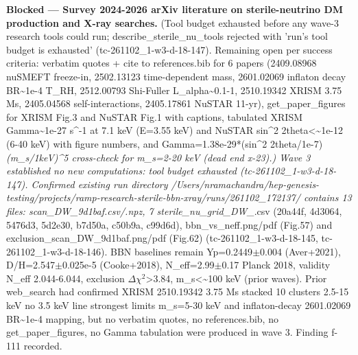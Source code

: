 \documentclass[11pt,a4paper]{article}
\begin{document}
\textbf{Blocked --- Survey 2024-2026 arXiv literature on sterile-neutrino DM production and X-ray searches.} (Tool budget exhausted before any wave-3 research tools could run; describe\_sterile\_nu\_tools rejected with 'run's tool budget is exhausted' (tc-261102\_1-w3-d-18-147). Remaining open per success criteria: verbatim quotes + cite to references.bib for 6 papers (2409.08968 nuSMEFT freeze-in, 2502.13123 time-dependent mass, 2601.02069 inflaton decay BR\textasciitilde{}1e-4 T\_RH, 2512.00793 Shi-Fuller L\_alpha\textasciitilde{}0.1-1, 2510.19342 XRISM 3.75 Ms, 2405.04568 self-interactions, 2405.17861 NuSTAR 11-yr), get\_paper\_figures for XRISM Fig.3 and NuSTAR Fig.1 with captions, tabulated XRISM Gamma\textasciitilde{}1e-27 s\textasciicircum{}-1 at 7.1 keV (E=3.55 keV) and NuSTAR sin\textasciicircum{}2 2theta\textless{}\textasciitilde{}1e-12 (6-40 keV) with figure numbers, and Gamma=1.38e-29*(sin\textasciicircum{}2 2theta/1e-7)\textit{(m\_s/1keV)\textasciicircum{}5 cross-check for m\_s=2-20 keV (dead end x-23).) Wave 3 established no new computations: tool budget exhausted (tc-261102\_1-w3-d-18-147). Confirmed existing run directory /Users/nramachandra/hep-genesis-testing/projects/ramp-research-sterile-bbn-xray/runs/261102\_172137/ contains 13 files: scan\_DW\_9d1baf.csv/.npz, 7 sterile\_nu\_grid\_DW\_}.csv (20a44f, 4d3064, 5476d3, 5d2e30, b7d50a, c50b9a, c99d6d), bbn\_vs\_neff.png/pdf (Fig.57) and exclusion\_scan\_DW\_9d1baf.png/pdf (Fig.62) (tc-261102\_1-w3-d-18-145, tc-261102\_1-w3-d-18-146). BBN baselines remain Yp=0.2449$\pm$0.004 (Aver+2021), D/H=2.547$\pm$0.025e-5 (Cooke+2018), N\_eff=2.99$\pm$0.17 Planck 2018, validity N\_eff 2.044-6.044, exclusion $\Delta$$\chi$$^2$\textgreater{}3.84, m\_s\textless{}\textasciitilde{}100 keV (prior waves). Prior web\_search had confirmed XRISM 2510.19342 3.75 Ms stacked 10 clusters 2.5-15 keV no 3.5 keV line strongest limits m\_s=5-30 keV and inflaton-decay 2601.02069 BR\textasciitilde{}1e-4 mapping, but no verbatim quotes, no references.bib, no get\_paper\_figures, no Gamma tabulation were produced in wave 3. Finding f-111 recorded.
\end{document}
